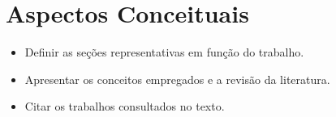 \chapter{Aspectos Conceituais} \label{cap:conceitos}

\begin{itemize}
    \item Definir as seções representativas em função do trabalho.
    \item Apresentar os conceitos empregados e a revisão da literatura.
    \item Citar os trabalhos consultados no texto.
\end{itemize}
    